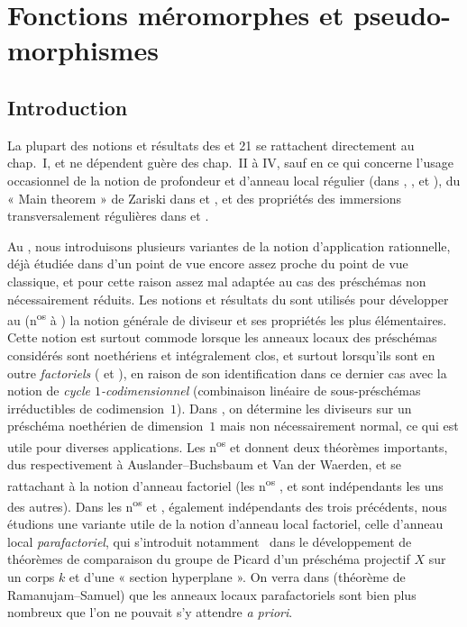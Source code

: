 \section{Fonctions méromorphes et pseudo-morphismes}
\label{IV.20}

\setcounter{subsection}{-1}
\subsection{Introduction}
\label{IV.20.0}

La plupart des notions et résultats des \textsection{} et 21 se rattachent directement au chap.~I, et ne dépendent guère des chap.~II à IV, sauf en ce qui concerne l'usage occasionnel de la notion de profondeur et d'anneau local régulier (dans , ,  et ), du « Main theorem » de Zariski dans  et , et des propriétés des immersions transversalement régulières dans  et .

Au , nous introduisons plusieurs variantes de la notion d'application rationnelle, déjà étudiée dans  d'un point de vue encore assez proche du point de vue classique, et pour cette raison assez mal adaptée au cas des préschémas non nécessairement réduits.
Les notions et résultats du  sont utilisés pour développer au  (n\textsuperscript{os}  à ) la notion générale de diviseur et ses propriétés les plus élémentaires.
Cette notion est surtout commode lorsque les anneaux locaux des préschémas considérés sont noethériens et intégralement clos, et surtout lorsqu'ils sont en outre \emph{factoriels} ( et ), en raison de son identification dans ce dernier cas avec la notion de \emph{cycle $1$-codimensionnel} (combinaison linéaire de sous-préschémas irréductibles de codimension~$1$).
Dans , on détermine les diviseurs sur un préschéma noethérien de dimension~$1$ mais non nécessairement normal, ce qui est utile pour diverses applications.
Les n\textsuperscript{os}  et  donnent deux théorèmes importants, dus respectivement à Auslander--Buchsbaum et Van der Waerden, et se rattachant à la notion d'anneau factoriel (les n\textsuperscript{os} ,  et  sont indépendants les uns des autres).
Dans les n\textsuperscript{os}  et , également indépendants des trois précédents, nous étudions une variante utile de la notion d'anneau local factoriel, celle d'anneau local \emph{parafactoriel}, qui s'introduit notamment~\cite{IV-41} dans le développement de théorèmes de comparaison du groupe de Picard d'un préschéma projectif $X$ sur un corps $k$ et d'une « section hyperplane ».
On verra dans  (théorème de Ramanujam--Samuel) que les anneaux locaux parafactoriels sont bien plus nombreux que l'on ne pouvait s'y attendre \emph{a priori}.

